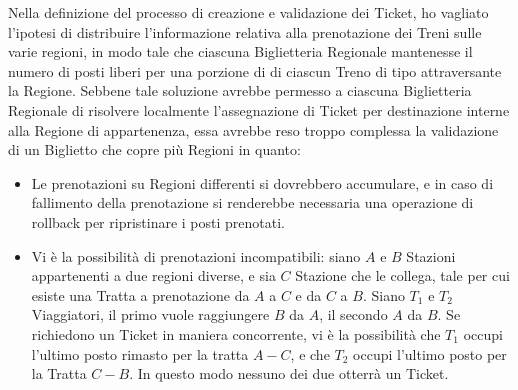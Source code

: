 		Nella definizione del processo di creazione e validazione dei Ticket, ho vagliato l'ipotesi di distribuire l'informazione relativa alla prenotazione dei Treni sulle varie regioni, in modo tale che ciascuna Biglietteria Regionale mantenesse il numero di posti liberi per una porzione di  di ciascun Treno di tipo  attraversante la Regione. Sebbene tale soluzione avrebbe permesso a ciascuna Biglietteria Regionale di risolvere localmente l'assegnazione di Ticket per destinazione interne alla Regione di appartenenza, essa avrebbe reso troppo complessa la validazione di un Biglietto che copre più Regioni in quanto:
		\begin{itemize}
			\item Le prenotazioni su Regioni differenti si dovrebbero accumulare, e in caso di fallimento della prenotazione si renderebbe necessaria una operazione di rollback per ripristinare i posti prenotati.
			\item Vi è la possibilità di prenotazioni incompatibili: siano $A$ e $B$ Stazioni appartenenti a due regioni diverse, e sia $C$ Stazione che le collega, tale per cui esiste una Tratta a prenotazione da $A$ a $C$ e da $C$ a $B$. Siano $T_1$ e $T_2$ Viaggiatori, il primo vuole raggiungere $B$ da $A$, il secondo $A$ da $B$. Se richiedono un Ticket in maniera concorrente, vi è la possibilità che $T_1$ occupi l'ultimo posto rimasto per la tratta $A-C$, e che $T_2$ occupi l'ultimo posto per la Tratta $C-B$. In questo modo nessuno dei due otterrà un Ticket.
		\end{itemize}
	 
	
	
